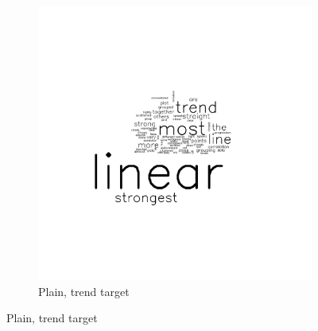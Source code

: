 \documentclass[11pt]{isuthesis}\usepackage[]{graphicx}\usepackage[]{color}
\begin{document}
\begin{figure}[ht]
\begin{subfigure}[t]{0.25\linewidth}
\end{subfigure}
\begin{subfigure}[t]{0.25\linewidth}
  \caption{Plain, trend target}
  \includegraphics[width=\linewidth]{fig-sentiment-3}
\end{subfigure}


\end{figure}
\end{document}
